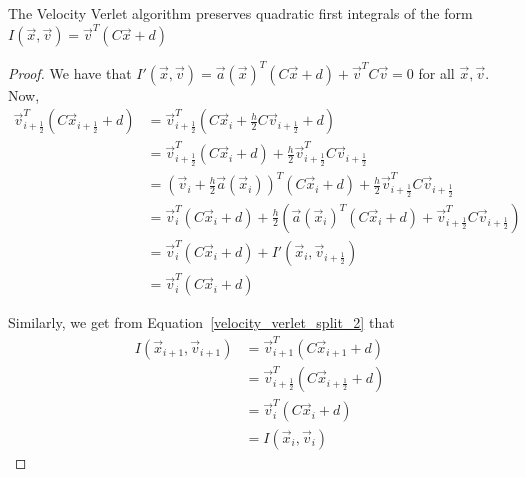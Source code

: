\documentclass[../Main.tex]{subfiles}
\begin{document}
\begin{theorem} The Velocity Verlet algorithm preserves quadratic first integrals of the form $I(\vec{x}, \vec{v}) = \vec{v}^{T}\left(C\vec{x} + d\right)$ \end{theorem}
\begin{proof}
We have that $I'(\vec{x}, \vec{v}) = \vec{a}(\vec{x})^{T}\left(C\vec{x} + d\right) + \vec{v}^{T}C\vec{v} = 0$ for all $\vec{x}, \vec{v}$.
Now,
\begin{align*}
\vec{v}_{i+\frac{1}{2}}^{T}\left(C\vec{x}_{i+\frac{1}{2}} + d\right) &= \vec{v}_{i+\frac{1}{2}}^{T}\left(C\vec{x}_{i} + \frac{h}{2}C\vec{v}_{i+\frac{1}{2}} + d\right) \\
&= \vec{v}_{i+\frac{1}{2}}^{T}\left(C\vec{x}_{i} + d\right) + \frac{h}{2}\vec{v}_{i+\frac{1}{2}}^{T}C\vec{v}_{i+\frac{1}{2}} \\
&= \left(\vec{v}_{i} + \frac{h}{2}\vec{a}(\vec{x}_{i})\right)^{T}\left(C\vec{x}_{i} + d\right)+ \frac{h}{2}\vec{v}_{i+\frac{1}{2}}^{T}C\vec{v}_{i+\frac{1}{2}} \\
&=\vec{v}_{i}^{T}(C\vec{x}_{i} + d) + \frac{h}{2}\left( \vec{a}(\vec{x}_{i})^{T}(C\vec{x}_{i} + d) + \vec{v}_{i+\frac{1}{2}}^{T}C\vec{v}_{i+\frac{1}{2}}\right) \\
&=\vec{v}_{i}^{T}(C\vec{x}_{i} + d) + I'(\vec{x}_{i}, \vec{v}_{i+\frac{1}{2}}) \\
&=\vec{v}_{i}^{T}(C\vec{x}_{i} + d)
\end{align*}

Similarly, we get from Equation~\ref{velocity_verlet_split_2} that
\begin{align*}
I(\vec{x}_{i+1}, \vec{v}_{i+1}) &=\vec{v}_{i+1}^{T}(C\vec{x}_{i+1} + d) \\
&= \vec{v}_{i+\frac{1}{2}}^{T}\left(C\vec{x}_{i+\frac{1}{2}} + d\right) \\
&=\vec{v}_{i}^{T}(C\vec{x}_{i} + d) \\
&= I(\vec{x}_{i}, \vec{v}_{i})
\end{align*}
\end{proof}
\end{document}
